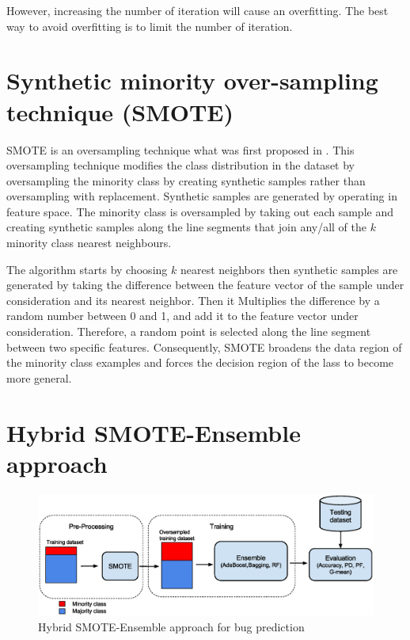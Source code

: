 \documentclass[runningheads,a4paper]{llncs}
\begin{document}
However, increasing the number of iteration will cause an overfitting. The best way to avoid overfitting is to limit the number of iteration.


\section{Synthetic minority over-sampling technique (SMOTE)}

SMOTE is an oversampling technique what was first proposed in \cite{chawla2002smote}. This oversampling technique modifies the class distribution in the dataset by oversampling the minority class by creating synthetic samples rather than oversampling with replacement. Synthetic samples are generated by operating in feature space.
The minority class is oversampled by taking out each sample and creating synthetic samples along the line segments that join any/all of the $k$ minority class nearest neighbours. 

The algorithm starts by choosing $k$ nearest neighbors then synthetic samples
are generated by taking the difference between the feature vector of the sample
under consideration and its nearest neighbor. Then it Multiplies the difference by a random number between 0 and 1, and add it to the feature vector under consideration. Therefore, a random point is selected along the line segment between two specific features. Consequently, SMOTE broadens the data region of the minority class examples and forces the decision region of the lass to become more general.

\section{Hybrid SMOTE-Ensemble approach}

 
 
 \begin{figure}[h]
\label{fig:ss}
\begin{center}
\includegraphics[scale=0.45]{Framework.eps}
\caption{Hybrid SMOTE-Ensemble approach for bug prediction}
\end{center}
\label{fig:confusion}
\end{figure}
\end{document}

